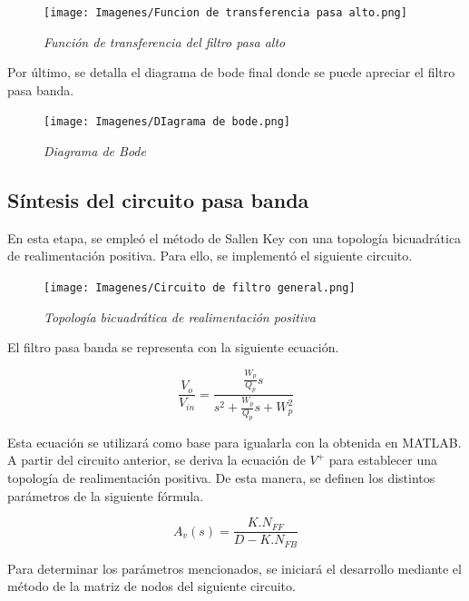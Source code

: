 \documentclass[12pt,A4paper,titlepage]{article}
\begin{document}
\begin{figure}[!h] 
  \centering
  \texttt{[image: Imagenes/Funcion de transferencia pasa alto.png]}
  \caption{\textit{Función de transferencia del filtro pasa alto}}
\end{figure}


\newpage
\hspace{1mm} Por último, se detalla el diagrama de bode final donde se puede apreciar el filtro pasa banda.

\bigskip
\begin{figure}[!h] 
  \centering
  \texttt{[image: Imagenes/DIagrama de bode.png]}
  \caption{\textit{Diagrama de Bode}}
\end{figure}


\newpage
\subsection{Síntesis del circuito pasa banda}
\hspace{1mm} En esta etapa, se empleó el método de Sallen Key con una topología bicuadrática de realimentación positiva. Para ello, se implementó el siguiente circuito.

\begin{figure}[!h] 
  \centering
  \texttt{[image: Imagenes/Circuito de filtro general.png]}
  \caption{\textit{Topología bicuadrática de realimentación positiva}}
\end{figure}

\hspace{1mm} El filtro pasa banda se representa con la siguiente ecuación.

\begin{equation}
    \frac{V_o}{V_{in}} = \frac{\frac{W_p}{Q_p} s}{s^2 + \frac{W_p}{Q_p} s + W_p^2}
\end{equation}

\bigskip
\hspace{1mm} Esta ecuación se utilizará como base para igualarla con la obtenida en MATLAB. A partir del circuito anterior, se deriva la ecuación de \(V^+\) para establecer una topología de realimentación positiva. De esta manera, se definen los distintos parámetros de la siguiente fórmula.

\begin{equation}
    A_v(s) = \frac{K . N_{FF}}{D - K . N_{FB}}
\end{equation}

\bigskip
\hspace{1mm} Para determinar los parámetros mencionados, se iniciará el desarrollo mediante el método de la matriz de nodos del siguiente circuito.
\end{document}
